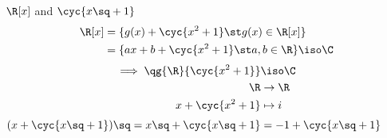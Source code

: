 \begin{example}
  \( \R[x] \) and \( \cyc{x\sq+1} \)
  \begin{align*}
    \R[x] &= \{ g(x) + \cyc{x^2+1} \st g(x)\in \R[x] \} \\
          &= \{ ax+b + \cyc{x^2+1} \st a,b\in \R \} \iso \C
  \end{align*}
  \begin{align*}
    \implies \qg{\R}{\cyc{x^2+1}}&\iso\C \\
    \R &\to \R \\
    x+\cyc{x^2+1} &\mapsto i
  \end{align*}
  \( (x+\cyc{x\sq +1})\sq = x\sq + \cyc{x\sq+1} = -1+\cyc{x\sq+1} \)
\end{example}